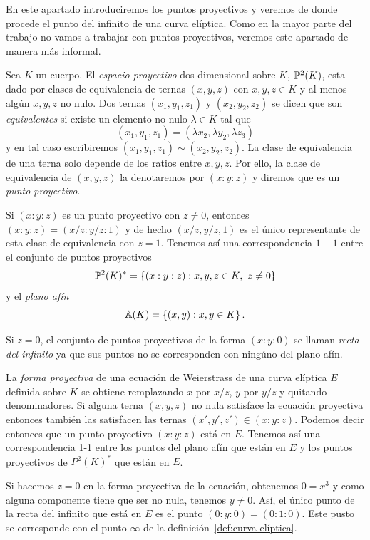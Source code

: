 En este apartado introduciremos los puntos proyectivos y veremos de donde procede el punto del infinito de una curva elíptica. Como en la mayor parte del trabajo no vamos a trabajar con puntos proyectivos, veremos este apartado de manera más informal.

Sea $K$ un cuerpo. El \emph{espacio proyectivo} dos dimensional sobre $K$, $\P^2(K)$, esta dado por clases de equivalencia de ternas $(x, y, z)$ con $x, y, z \in K$ y al menos algún $x, y, z$ no nulo. Dos ternas $(x_1, y_1, z_1)$ y $(x_2, y_2, z_2)$ se dicen que son \emph{equivalentes} si existe un elemento no nulo $\lambda \in K$ tal que
$$
	(x_1, y_1, z_1) = (\lambda x_2, \lambda y_2, \lambda z_3)
$$
y en tal caso escribiremos $(x_1, y_1, z_1) \sim (x_2, y_2, z_2)$. La clase de equivalencia de una terna solo depende de los ratios entre $x, y, z$. Por ello, la clase de equivalencia de $(x, y, z)$ la denotaremos por $(x : y : z)$ y diremos que es un \emph{punto proyectivo}.

Si $(x : y : z)$ es un punto proyectivo con $z \neq 0$, entonces $(x : y : z) = (x/z : y/z : 1)$ y de hecho $(x/z, y/z, 1)$ es el único representante de esta clase de equivalencia con $z = 1$. Tenemos así una correspondencia $1-1$ entre el conjunto de puntos proyectivos
$$
	\P^2(K)^* = \left\{(x : y : z) : x, y, z \in K,\ z \neq 0 \right\}
$$
y el \emph{plano afín}
$$
	\A(K) = \left\{(x, y) : x, y \in K \right\}.
$$

Si $z = 0$, el conjunto de puntos proyectivos de la forma $(x : y : 0)$ se llaman \emph{recta del infinito} ya que sus puntos no se corresponden con ningúno del plano afín.

La \emph{forma proyectiva} de una ecuación de Weierstrass de una curva elíptica $E$ definida sobre $K$ se obtiene remplazando $x$ por $x/z$, $y$ por $y/z$ y quitando denominadores. Si alguna terna $(x, y, z)$ no nula satisface la ecuación proyectiva entonces también las satisfacen las ternas $(x', y', z') \in (x : y : z)$. Podemos decir entonces que un punto proyectivo $(x : y : z)$ está en $E$. Tenemos así una correspondencia 1-1 entre los puntos del plano afín que están en $E$ y los puntos proyectivos de $P^2(K)^*$ que están en $E$.

Si hacemos $z = 0$ en la forma proyectiva de la ecuación, obtenemos $0 = x^3$ y como alguna componente tiene que ser no nula, tenemos $y \neq 0$. Así, el único punto de la recta del infinito que está en $E$ es el punto $(0 : y : 0) = (0 : 1 : 0)$. Este pusto se corresponde con el punto $\infty$ de la definición~\ref{def:curva elíptica}.

